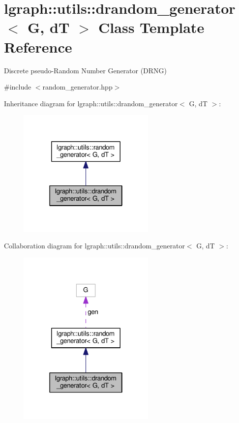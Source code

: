\hypertarget{classlgraph_1_1utils_1_1drandom__generator}{}\section{lgraph\+:\+:utils\+:\+:drandom\+\_\+generator$<$ G, dT $>$ Class Template Reference}
\label{classlgraph_1_1utils_1_1drandom__generator}


Discrete pseudo-\/\+Random Number Generator (D\+R\+NG)  




{\ttfamily \#include $<$random\+\_\+generator.\+hpp$>$}



Inheritance diagram for lgraph\+:\+:utils\+:\+:drandom\+\_\+generator$<$ G, dT $>$\+:
\nopagebreak
\begin{figure}[H]
\begin{center}
\leavevmode
\includegraphics[width=190pt]{classlgraph_1_1utils_1_1drandom__generator__inherit__graph}
\end{center}
\end{figure}


Collaboration diagram for lgraph\+:\+:utils\+:\+:drandom\+\_\+generator$<$ G, dT $>$\+:
\nopagebreak
\begin{figure}[H]
\begin{center}
\leavevmode
\includegraphics[width=190pt]{classlgraph_1_1utils_1_1drandom__generator__coll__graph}
\end{center}
\end{figure}
